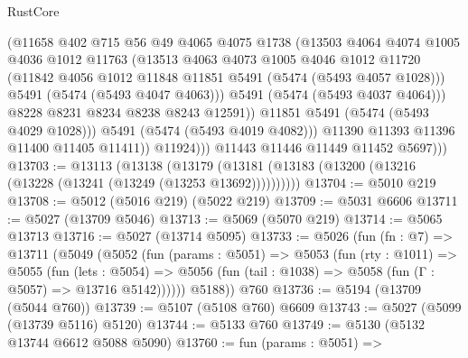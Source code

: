 \begin{lexlean}{RustCore}
\begin{coremodule}
                          (@11658
                            @402
                            @715
                            @56
                            @49
                            @4065
                            @4075
                            @1738
                            (@13503
                              @4064
                              @4074
                              @1005
                              @4036
                              @1012
                              @11763
                              (@13513
                                @4063
                                @4073
                                @1005
                                @4046
                                @1012
                                @11720
                                (@11842 @4056 @1012 @11848 @11851 @5491 (@5474 (@5493 @4057 @1028)))
                                @5491
                                (@5474 (@5493 @4047 @4063)))
                              @5491
                              (@5474 (@5493 @4037 @4064)))
                            @8228
                            @8231
                            @8234
                            @8238
                            @8243
                            @12591))
                        @11851
                        @5491
                        (@5474 (@5493 @4029 @1028)))
                      @5491
                      (@5474 (@5493 @4019 @4082)))
                    @11390
                    @11393
                    @11396
                    @11400
                    @11405
                    @11411))
                @11924)))
          @11443
          @11446
          @11449
          @11452
          @5697)))
@13703 := @13113
    (@13138 (@13179 (@13181 (@13183 (@13200 (@13216 (@13228 (@13241 (@13249 (@13253 @13692))))))))))
@13704 := @5010 @219
@13708 := @5012 (@5016 @219) (@5022 @219)
@13709 := @5031 @6606
@13711 := @5027 (@13709 @5046)
@13713 := @5069 (@5070 @219)
@13714 := @5065 @13713
@13716 := @5027 (@13714 @5095)
@13733 := @5026
    (fun (fn : @7) =>
    @13711
      (@5049
        (@5052
          (fun (params : @5051) =>
          @5053
            (fun (rty : @1011) =>
            @5055
              (fun (lets : @5054) =>
              @5056 (fun (tail : @1038) => @5058 (fun (Γ : @5057) => @13716 @5142))))))
        @5188))
    @760
@13736 := @5194 (@13709 (@5044 @760))
@13739 := @5107 (@5108 @760) @6609
@13743 := @5027 (@5099 (@13739 @5116) @5120)
@13744 := @5133 @760
@13749 := @5130 (@5132 @13744 @6612 @5088 @5090)
@13760 := fun (params : @5051) =>

\end{coremodule}
\end{lexlean}
